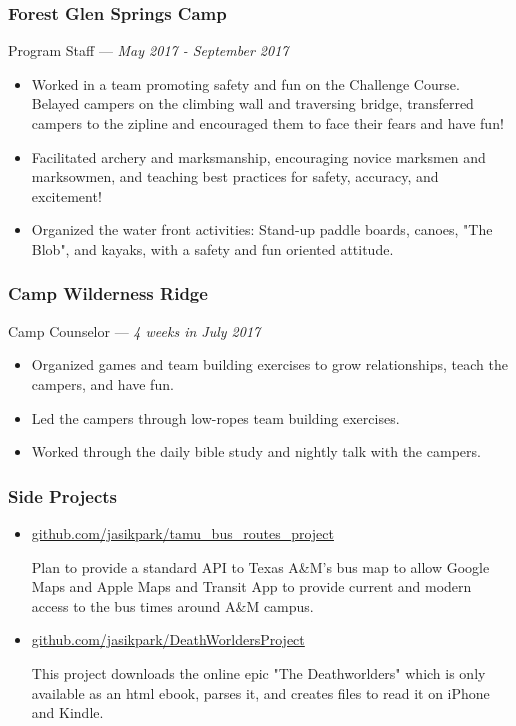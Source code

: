 \documentclass[letterpaper,10pt]{article}
\begin{document}
\subsubsection{Forest Glen Springs Camp}
\hfill Program Staff --- \emph{May 2017 - September 2017}

\begin{itemize}
\tightlist{}
\item
	Worked in a team promoting safety and fun on the Challenge Course. Belayed campers on the climbing wall and traversing bridge, transferred campers to the zipline and encouraged them to face their fears and have fun!
\item
	Facilitated archery and marksmanship, encouraging novice marksmen and marksowmen, and teaching best practices for safety, accuracy, and excitement!
\item
	Organized the water front activities: Stand-up paddle boards, canoes, "The Blob", and kayaks, with a safety and fun oriented attitude.
\end{itemize}

\subsubsection{Camp Wilderness Ridge}
\hfill Camp Counselor --- \emph{4 weeks in July 2017}

\begin{itemize}
\tightlist{}
\item
	Organized games and team building exercises to grow relationships, teach the campers, and have fun.
\item
	Led the campers through low-ropes team building exercises.
\item
	Worked through the daily bible study and nightly talk with the campers.
\end{itemize}


\subsubsection{Side Projects}

\begin{itemize}
\item
	\href{https://github.com/jasikpark/tamu\_bus\_routes\_project}{github.com/jasikpark/tamu\_bus\_routes\_project}
	
	Plan to provide a standard API to Texas A\&M's bus map to allow Google Maps and Apple Maps and Transit App to provide current and modern access to the bus times around A\&M campus.
\item
	\href{https://github.com/jasikpark/DeathWorldersProject}{github.com/jasikpark/DeathWorldersProject}
	
	This project downloads the online epic "The Deathworlders" which is only available as an html ebook, parses it, and creates files to read it on iPhone and Kindle.
\end{itemize}
\end{document}
